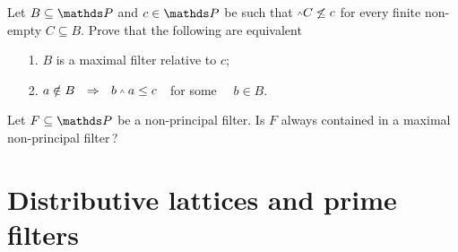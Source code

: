 \documentclass[creche.tex]{subfiles}
\begin{document}
\begin{exercise}
Let $B\subseteq \PP$ and $c\in \PP$ be such that $\swedge C\not\le c$ for every finite non-empty $C\subseteq B$. Prove that the following are equivalent
\begin{itemize}
\item[1.] $B$ is a maximal filter relative to $c$;
\item[2.] $a\notin B\ \ \IMP\ \ b\swedge a \le c$\ \  for some \ \ $b\in B$.\QED
\end{itemize}
\end{exercise}


\begin{exercise}
Let $F\subseteq\PP$ be a non-principal filter. Is $F$ always contained in a maximal non-principal filter\,?\QED
\end{exercise}



\section{Distributive lattices and prime filters}\label{prime_filters}
\end{document}
